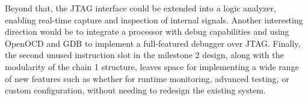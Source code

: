 \documentclass[a4paper,11pt,oneside]{report}
\begin{document}
Beyond that, the JTAG interface could be extended into a logic analyzer, enabling real-time capture and inspection of internal signals. 
Another interesting direction would be to integrate a processor with debug capabilities and using OpenOCD and GDB to implement a full-featured debugger over JTAG. 
Finally, the second unused instruction slot in the milestone 2 design, along with the modularity of the chain 1 structure, leaves space for implementing a wide range of new features such as whether for runtime monitoring, 
advanced testing, or custom configuration, without needing to redesign the existing system.

\cleardoublepage
{}
{}
\printbibliography

%
%
\end{document}
